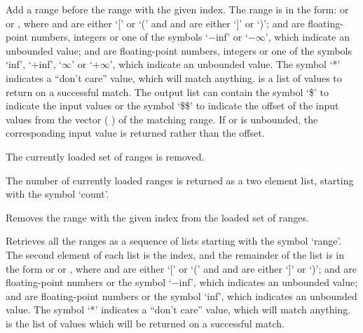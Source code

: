   Add a range before the range with the given index.
  The range is in the form:  or   or , where
   and  are either `[' or `(' and  and  are
  either `]' or `)';
   and  are floating-point numbers, integers or one of the symbols `$-$inf' or
  `$-\infty$', which indicate an unbounded value;
   and  are floating-point numbers, integers or one of the symbols `inf', `$+$inf',
  `$\infty$' or `$+\infty$', which indicate an unbounded value.
  The symbol `*' indicates a ``don't care'' value, which will match anything.
   is a list of values to return on a successful match.
  The output list can contain the symbol `\$' to indicate the input values or the symbol `\$\$' to
  indicate the offset of the input values from the vector ( ) of the matching range.
  If  or  is unbounded, the corresponding input value is returned rather than the offset.

  The currently loaded set of ranges is removed.
  
  The number of currently loaded ranges is returned as a two element list, starting with the symbol
  `count'.
  
  Removes the range with the given index from the loaded set of ranges.

  Retrieves all the ranges as a sequence of lists starting with the symbol `range'.
  The second element of each list is the index, and the remainder of the list is in the form
   or   or ,
  where  and  are either `[' or `(' and  and 
  are either `]' or `)';  and  are floating-point numbers or the symbol `$-$inf',
  which indicates an unbounded value;  and  are floating-point numbers or
  the symbol `inf', which indicates an unbounded value.
  The symbol `*' indicates a ``don't care'' value, which will match anything.
   is the list of values which will be returned on a successful match.

